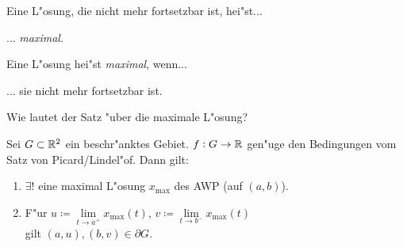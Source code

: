 \documentclass[9pt]{article}
\newcommand{\R}[1]{%
	\ifthenelse{\equal{#1}{}}
		{\mathbb{R}}
		{\mathbb{R}^#1}}%
\newenvironment{field}{}{\newpage}
\newif\ifnote
\newenvironment{note}{\notetrue}{\notefalse}
\newcommand{\localtag}{}
\newcommand{\globaltag}{}
\newcommand{\uuid}{}
\newcommand{\tags}[1]{
    \ifnote 
        \renewcommand{\localtag}{#1}
    \else
        \renewcommand{\globaltag}{#1}
    \fi 
    }
\newcommand{\xplain}[1]{\renewcommand{\uuid}{#1}}
\begin{document}
\begin{note}
	\xplain{UUID}
	\tags{definition, fortsetzung,, 3.5.3, 3.5.4}
	
	\begin{field}  %
		Eine L"osung, die nicht mehr fortsetzbar ist, hei"st...
	\end{field}
	
	\begin{field}  %
		... \textit{maximal}.
	\end{field}
		
	\begin{field}  %
		Eine L"osung hei"st \textit{maximal}, wenn...
	\end{field}
	
	\begin{field}  %
		... sie nicht mehr fortsetzbar ist.
	\end{field}
		
	\begin{field}  %
		Wie lautet der Satz "uber die maximale L"osung?
	\end{field}
	
	\begin{field}  %
		Sei $G \subset \R{2}$ ein beschr"anktes Gebiet. $f: G \rightarrow \R{}$ gen"uge den Bedingungen vom Satz von Picard/Lindel"of. Dann gilt:
		\begin{enumerate}
			\item $\exists!$ eine maximal L"osung $x_{\text{max}}$ des AWP (auf $(a,b)$).
			\item F"ur $u \coloneqq \lim\limits_{t\rightarrow a^+}x_{\text{max}}(t)$,
			$v\coloneqq \lim\limits_{t\rightarrow b^-}x_{\text{max}}(t)$ \\
			gilt $(a,u), (b,v) \in \partial G$.
		\end{enumerate}
	\end{field}
\end{note}
\end{document}

